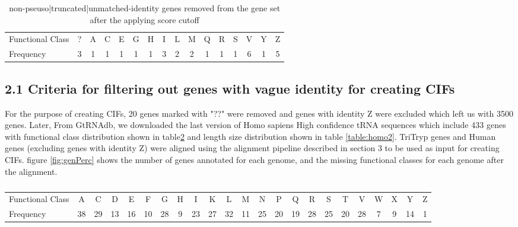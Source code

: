 \documentclass[table,
12pt, %
a4paper, %
oneside, %
headinclude,footinclude, %
BCOR5mm, %
]{scrartcl}
\begin{document}
\begin{table}[htbp]
  \caption{non-pseuso|truncated|unmatched-identity genes removed from the gene set after the applying score cutoff}
  \begin{adjustbox}{width=10cm,center}
    \begin{tabular}{|l|ccccccccccccccc|}
      \hline
      Functional Class & ? & A & C & E & G & H & I & L & M & Q & R & S & V & Y & Z \\
      Frequency        & 3 & 1 & 1 & 1 & 1 & 1 & 3 & 2 & 2 & 1 & 1 & 1 & 6 & 1 & 5 \\
      \hline
    \end{tabular}
    \label{table:removedgenes}
  \end{adjustbox}
\end{table}

\subsection{2.1 Criteria for filtering out genes with vague identity for creating CIFs}
For the purpose of creating CIFs, 20 genes marked with "??" were removed and genes with identity Z were excluded which left us with 3500 genes. Later, From GtRNAdb, we downloaded the last version of Homo sapiens High confidence tRNA sequences which include 433 genes with functional class distribution shown in table\ref{table:homo1} and length size distribution shown in table \ref{table:homo2}. TriTryp genes and Human genes (excluding genes with identity Z) were aligned using the alignment pipeline described in section 3 to be used as input for creating CIFs. figure \ref{fig:genPerc} shows the number of genes annotated for each genome, and the missing functional classes for each genome after the alignment.

\begin{table}[htbp]
  \caption{}
  \begin{adjustbox}{width=15cm,center}
    \begin{tabular}{|l|c c c c c c c c c c c c c c c c c c c c c c|}
      \hline
      Functional Class & A  & C  & D  & E  & F  & G  & H & I  & K  & L  & M  & N  & P  & Q  & R  & S  & T  & V  & W & X & Y  & Z \\

      Frequency        & 38 & 29 & 13 & 16 & 10 & 28 & 9 & 23 & 27 & 32 & 11 & 25 & 20 & 19 & 28 & 25 & 20 & 28 & 7 & 9 & 14 & 1 \\
      \hline
    \end{tabular}
    \label{table:homo1}
  \end{adjustbox}
\end{table}
\end{document}
